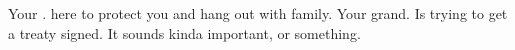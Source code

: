 \documentclass[char]{NeptuneBall}
\begin{document}
%
%
%

\begin{contacts}
  \contact{\cAriel{}} Your \cAriel{\parent}. \cAriel{\They} \cAriel{\are} here to protect you and hang out with \cAriel{\their} family.
	\contact{\cKing{}} Your grand\cKing{\parent}. Is trying to get a treaty signed. It sounds kinda important, or something.
\end{contacts}
\end{document}
